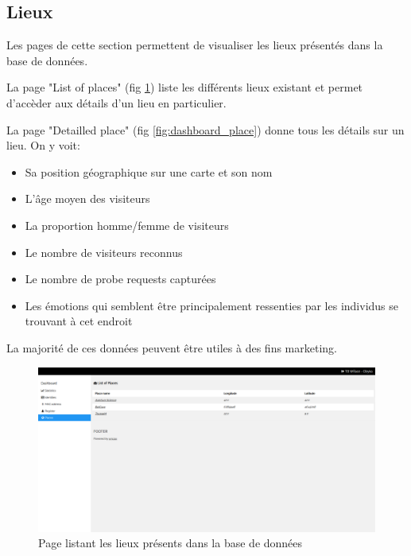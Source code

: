 \subsection{Lieux}
Les pages de cette section permettent de visualiser les lieux présentés dans la base de données.

La page "List of places" (fig \ref{fig:dashboard_list_places}) liste les différents lieux existant et permet d'accèder aux détails d'un lieu en particulier.

La page "Detailled place" (fig \ref{fig:dashboard_place}) donne tous les détails sur un lieu. On y voit:
\begin{itemize}
    \item Sa position géographique sur une carte et son nom
    \item L'âge moyen des visiteurs
    \item La proportion homme/femme de visiteurs
    \item Le nombre de visiteurs reconnus
    \item Le nombre de probe requests capturées
    \item Les émotions qui semblent être principalement ressenties par les individus se trouvant à cet endroit
\end{itemize}

La majorité de ces données peuvent être utiles à des fins marketing.

\clearpage
\newpage
\thispagestyle{empty}
\begin{landscape}
    \centering
\thispagestyle{empty}
\begin{figure}[H]
	\includegraphics[width=0.95\linewidth]{images/dashboard/places.png}
	\caption{Page listant les lieux présents dans la base de données}
	\label{fig:dashboard_list_places}
\end{figure}
\end{landscape}

